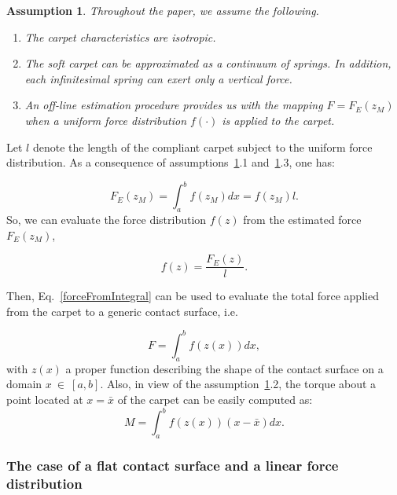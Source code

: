 \documentclass{article}
\newtheorem{assumption}{\bf{Assumption}}
\begin{document}
\begin{assumption}
\label{hp:uniformity} 
Throughout the paper, we assume the following.
\begin{enumerate}
    \item The carpet characteristics are isotropic.
    \item The soft carpet can be approximated as a continuum of springs. In addition, each infinitesimal spring can  exert only a vertical force.
    \item An off-line estimation procedure provides us with the mapping $F = F_E(z_M)$ when a uniform force distribution $f(\cdot)$ is applied to the carpet.
\end{enumerate}
\end{assumption}

Let $l$ denote the length of the compliant carpet subject to the uniform force distribution. As a consequence of assumptions~\ref{hp:uniformity}.1 and~\ref{hp:uniformity}.3, one has:

\begin{equation}
\label{forceFromIntegral}
F_E(z_M) = \int_{a}^{b} f(z_M) dx = f(z_M) l.
\end{equation}
So, we can evaluate the force distribution $f(z)$ from the estimated force $F_E(z_M)$, 

\begin{equation}
f(z) = \frac{F_E(z)}{l}.
\end{equation}

Then, 
Eq.~\eqref{forceFromIntegral} can be used to evaluate  the total force applied from the carpet to a generic contact surface, i.e.

\begin{equation}
\label{forceFromIntegral1}
F = \int_{a}^{b} f(z(x)) dx,
\end{equation}
with $z(x)$  a proper function describing the shape of the  contact surface on a domain $x~\in~[a,b]$.
Also, in view of the assumption~\ref{hp:uniformity}.2, the torque about a point located at $x = \bar{x}$ of the carpet can  be easily computed as:
\begin{equation}
\label{momentFromIntegral}
M = \int_{a}^{b} f(z(x))(x-\bar{x}) dx.
\end{equation}

\subsubsection{The case of a flat contact surface and a linear force distribution}
\end{document}
